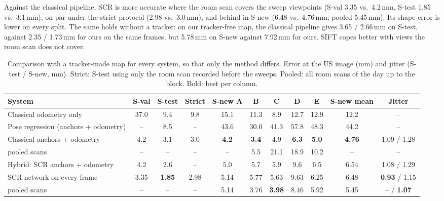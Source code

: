 \documentclass[journal]{IEEEtran}
\newcommand{\Sval}{S-val}
\newcommand{\Stest}{S-test}
\newcommand{\Snew}{S-new}
\begin{document}
Against the classical pipeline, SCR is more accurate where the room scan covers the sweep viewpoints (\Sval{} 3.35 vs.\ 4.2\,mm, \Stest{} 1.85 vs.\ 3.1\,mm), on par under the strict protocol (2.98 vs.\ 3.0\,mm), and behind in \Snew{} (6.48 vs.\ 4.76\,mm; pooled 5.45\,mm). Its shape error is lower on every split. The same holds without a tracker: on our tracker-free map, the classical pipeline gives 3.65 / 2.66\,mm on \Stest{}, against 2.35 / 1.73\,mm for ours on the same frames, but 5.78\,mm on \Snew{} against 7.92\,mm for ours. SIFT copes better with views the room scan does not cover.

\begin{table}[t]
  \caption{Comparison with a tracker-made map for every system, so that only the method differs. Error at the US image (mm) and jitter (\Stest{} / \Snew{}, mm). Strict: \Stest{} using only the room scan recorded before the sweeps. Pooled: all room scans of the day up to the block. Bold: best per column.}
  \label{tab:compare}
  \centering
  \scriptsize
  \setlength{\tabcolsep}{4pt}
  \begin{tabular}{@{}lcccccccccc@{}}
    \toprule
    System & \Sval & \Stest & Strict & \Snew{} A & B & C & D & E & \Snew{} mean & Jitter\\
    \midrule
    Classical odometry only & 37.0 & 9.4 & 9.8 & 15.1 & 11.3 & 8.9 & 12.7 & 12.9 & 12.2 & --\\
    Pose regression (anchors + odometry) & -- & 8.5 & -- & 43.6 & 30.0 & 41.3 & 57.8 & 48.3 & 44.2 & --\\
    Classical anchors + odometry & 4.2 & 3.1 & 3.0 & \textbf{4.2} & \textbf{3.4} & 4.9 & \textbf{6.3} & \textbf{5.0} & \textbf{4.76} & 1.09 / 1.28\\
    \quad pooled scans & -- & -- & -- & -- & 5.5 & 21.1 & 18.9 & 10.2 & -- & --\\
    Hybrid: SCR anchors + odometry & 4.2 & 2.6 & -- & 5.0 & 5.7 & 5.9 & 9.6 & 6.5 & 6.54 & 1.08 / 1.29\\
    SCR network on every frame & 3.35 & \textbf{1.85} & 2.98 & 5.14 & 5.77 & 5.63 & 9.63 & 6.25 & 6.48 & \textbf{0.93} / 1.15\\
    \quad pooled scans & -- & -- & -- & 5.14 & 3.76 & \textbf{3.98} & 8.46 & 5.92 & 5.45 & -- / \textbf{1.07}\\
    \bottomrule
  \end{tabular}
\end{table}
\end{document}
